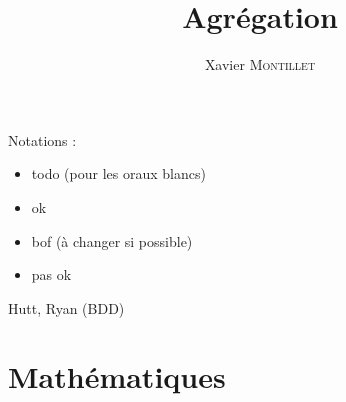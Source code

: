\documentclass[10pt,a4paper]{report}
\newcommand{\green}[1]{
	\textcolor{OliveGreen}{#1}
}
\newcommand{\blue}[1]{
	\textcolor{blue}{#1}
}
\newcommand{\orange}[1]{
	\textcolor{orange}{#1}
}
\newcommand{\red}[1]{
	\textcolor{red}{#1}
}
\newcommand{\ok}{\green{\ding{52}}}
\newcommand{\todo}{\blue{\ding{228}}}
\newcommand{\bof}{\orange{\Yingyang}}
\newcommand{\nok}{\red{\ding{56}}}
\providecommand{\base}{.}
\begin{document}
\title{Agrégation}
\author{Xavier \textsc{Montillet}}
\maketitle

\newpage
Notations :
\begin{itemize}
	\item[\todo] todo (pour les oraux blancs)
	\item[\ok] ok
	\item[\bof] bof (à changer si possible)
	\item[\nok] pas ok
\end{itemize}



Hutt, Ryan (BDD)

\part{Mathématiques}

\newrefsegment
\end{document}
